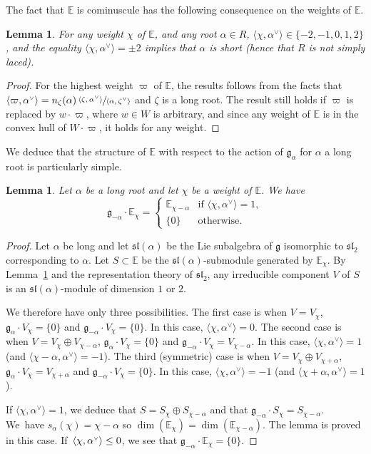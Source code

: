 \documentclass[JEP,XML,SOM,Unicode,NoFloatCountersInSection]{cedram}
\let\oldvee\vee
\renewcommand{\vee}{{\scriptscriptstyle\oldvee}}
\theoremstyle{plain}
\newtheorem{lemm}[theo]{Lemma}
\theoremstyle{definition}
\newcommand{\bE}{\mathbb{E}}
\newcommand{\fgg}{\mathfrak{g}}
\newcommand{\fsl}{\mathfrak{sl}}
\newcommand{\scal}[1]{\langle #1 \rangle}
\begin{document}
The fact that $\bE$ is cominuscule has the following consequence on the weights of $\bE$.

\begin{lemm}
\label{lemm:weight2}
For any weight $\chi$ of $\bE$, and any root $\alpha\in R$, $\scal{\chi,\alpha^\vee}
\in\{-2,-1,0,1,2\}$, and the equality
$\scal{\chi,\alpha^\vee} = \pm 2$ implies that $\alpha$ is short (hence that $R$ is not simply laced).
\end{lemm}

\begin{proof}
For the highest weight $\varpi$ of $\bE$, the results follows from the facts that
$\scal{\varpi,\alpha^\vee}=n_\zeta(\alpha)\,\sfrac{\scal{\zeta,\alpha^\vee}}{\scal{\alpha,\zeta^\vee}}$
and $\zeta$ is a long root. The
result still holds if
$\varpi$ is replaced by $w \cdot \varpi$, where $w \in W$ is arbitrary, and since any weight of
$\bE$ is in the convex hull of $W \cdot \varpi$, it holds for any weight.
\end{proof}

We deduce that the structure of $\bE$ with respect to the action of $\fgg_\alpha$ for $\alpha$ a long
root is particularly simple.

\begin{lemm}
\label{lemm:gV}
Let $\alpha$ be a long root and let $\chi$ be a weight of $\bE$.
We have
$$
\fgg_{-\alpha} \cdot \bE_\chi =
\begin{cases}
\bE_{\chi-\alpha}& \mbox{if } \scal{\chi,\alpha^\vee} = 1, \\
\{ 0 \}& \mbox{otherwise}.
\end{cases}
$$
\end{lemm}
\begin{proof}
Let $\alpha$ be long and let $\fsl(\alpha)$ be the Lie subalgebra of $\fgg$ isomorphic to $\fsl_2$
corresponding to $\alpha$.
Let $S \subset \bE$ be the $\fsl(\alpha)$-submodule generated by $\bE_\chi$. By
Lemma~\ref{lemm:weight2} and the representation theory of $\fsl_2$,
any irreducible component $V$ of $S$ is an $\fsl(\alpha)$-module of dimension $1$ or $2$.

We therefore have
only three possibilities. The first case is when $V=V_\chi$, $\fgg_\alpha \cdot V_\chi = \{0\}$ and
$\fgg_{-\alpha} \cdot V_\chi = \{0\}$. In this case, $\scal{\chi,\alpha^\vee}=0$.
The second case is when $V=V_\chi \oplus V_{\chi - \alpha}$, $\fgg_\alpha \cdot V_\chi = \{0\}$ and
$\fgg_{-\alpha} \cdot V_\chi = V_{\chi-\alpha}$. In this case, $\scal{\chi,\alpha^\vee}=1$ (and
$\scal{\chi-\alpha,\alpha^\vee}=-1$).
The third (symmetric) case is when $V=V_\chi \oplus V_{\chi + \alpha}$, $\fgg_\alpha \cdot V_\chi =
V_{\chi + \alpha}$ and
$\fgg_{-\alpha} \cdot V_\chi = \{0\}$. In this case, $\scal{\chi,\alpha^\vee}=-1$ (and
$\scal{\chi+\alpha,\alpha^\vee}=1$).

If $\scal{\chi,\alpha^\vee} = 1$, we deduce that $S=S_\chi \oplus S_{\chi-\alpha}$ and that
$\fgg_{-\alpha} \cdot S_\chi = S_{\chi-\alpha}$. We~have $s_\alpha(\chi)=\chi-\alpha$ so
$\dim(\bE_\chi) = \dim(\bE_{\chi-\alpha})$. The lemma is proved in this case.
If~$\scal{\chi,\alpha^\vee} \leq\nobreak 0$, we see that $\fgg_{-\alpha} \cdot \bE_\chi = \{0\}$.
\end{proof}
\end{document}
